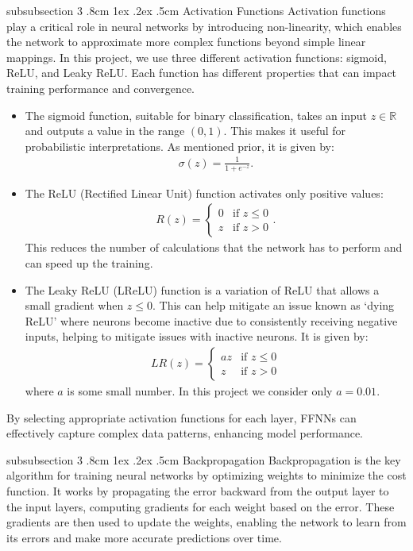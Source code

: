 \documentclass[%
reprint,s
amsmath,amssymb,
aps,
]{revtex4-2}
\makeatletter
\renewcommand{\subsubsection}{%
	\@startsection
	{subsubsection}%
	{3}%
	{\z@}%
	{.8cm \@plus1ex \@minus .2ex}%
	{.5cm}%
	{\normalfont\small\centering}%
}
\makeatother
\begin{document}
\subsubsection{Activation Functions}
Activation functions play a critical role in neural networks by introducing non-linearity, which enables the network to approximate more complex functions beyond simple linear mappings. In this project, we use three different activation functions: sigmoid, ReLU, and Leaky ReLU. Each function has different properties that can impact training performance and convergence.
\begin{itemize}
	\item The sigmoid function, suitable for binary classification, takes an input $z\in\mathbb{R}$ and outputs a value in the range $(0,1)$. This makes it useful for probabilistic interpretations. As mentioned prior, it is given by:
	\begin{align} 
		\sigma(z)=\frac{1}{1+e^{-z}}.
	\end{align}
	\item The ReLU (Rectified Linear Unit) function activates only positive values: 
	\begin{align} 
		R(z)=
		\begin{cases}
			0 & \text{if }z\leq0\\z&\text{if }z>0
		\end{cases}.
	\end{align}
	This reduces the number of calculations that the network has to perform and can speed up the training.
	\item The Leaky ReLU (LReLU) function is a variation of ReLU that allows a small gradient when $z\leq0$. This can help mitigate an issue known as `dying ReLU' where neurons become inactive due to consistently receiving negative inputs, helping to mitigate issues with inactive neurons. It is given by:
	\begin{align} 
		LR(z)=
		\begin{cases} 
			az&\text{if }z\leq0\\z&\text{if }z> 0 
		\end{cases} 
	\end{align}
	where $a$ is some small number. In this project we consider only $a=0.01$.
\end{itemize}
By selecting appropriate activation functions for each layer, FFNNs can effectively capture complex data patterns, enhancing model performance.

\subsubsection{Backpropagation}
Backpropagation is the key algorithm for training neural networks by optimizing weights to minimize the cost function. It works by propagating the error backward from the output layer to the input layers, computing gradients for each weight based on the error. These gradients are then used to update the weights, enabling the network to learn from its errors and make more accurate predictions over time.
\end{document}
